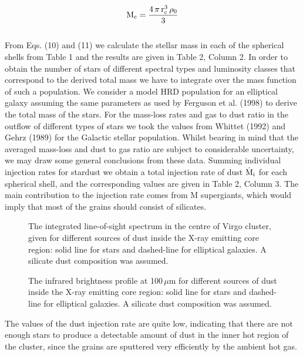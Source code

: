 \documentclass[]{aa}
\begin{document}
\begin{eqnarray}
{\rm M}_{\rm c}=\frac{4\,\pi\,{\rm r}_{\rm c}^3\,{\rho}_0}{3}
\end{eqnarray}\\
From Eqs. (10) and (11) we calculate the stellar mass in each of the spherical shells
from Table 1 and the results are given in Table 2, Column 2. In order to 
obtain 
the number of stars of different 
spectral types and luminosity classes that correspond to the derived total 
mass we have to integrate over the mass function of such a population. We 
consider a model HRD population for an elliptical galaxy assuming the same 
parameters as used by Ferguson et al. (1998) to derive the total mass of the 
stars. For the mass-loss rates and gas to dust ratio in the outflow of 
different types of stars we took the values from Whittet (1992) and Gehrz 
(1989) for the Galactic stellar population. Whilst bearing in mind that the 
averaged mass-loss and dust to gas ratio are subject to considerable 
uncertainty, we may draw some general conclusions from these data. Summing 
individual injection rates for stardust we obtain a total injection 
rate of dust ${\dot{{\rm M}}}_{\rm i}$ for each
spherical shell, and the corresponding values are given in Table 2, Column 3. 
The main contribution to the injection rate comes from M supergiants, which 
would imply that most of the grains should consist of silicates. 

\begin{figure}[htb]
\caption[]{The integrated line-of-sight spectrum in the centre of Virgo 
cluster, given for different sources of dust inside the X-ray emitting core
region: solid line for stars and dashed-line for elliptical galaxies. A
silicate dust composition was assumed. }
\end{figure} 



\begin{figure}[htb]
\caption[]{The infrared brightness profile at 100\,$\mu$m for different 
sources of dust inside the X-ray emitting core region: solid line for stars
 and dashed-line for elliptical galaxies. A
silicate dust composition was assumed. }
\end{figure} 


The values of the dust injection rate are quite low, indicating 
that there are
not enough stars to produce a detectable amount of dust in the inner hot region
of the cluster, since the grains are sputtered very efficiently by the ambient
hot gas. 
\end{document}
